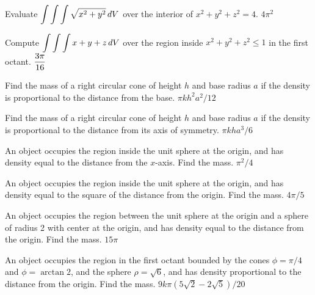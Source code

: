 \exercise Evaluate $\displaystyle\int\int\int \sqrt{x^2+y^2}\,dV$
over the interior of $x^2+y^2+z^2=4$.
\answer $4\pi^2$
\endanswer
\endexercise

\exercise Compute $\displaystyle\int\int\int
x+y+z\,dV$ over the region inside
$x^2+y^2+z^2\le 1$ in the first octant.
\answer $\displaystyle {3\pi\over16}$
\endanswer
\endexercise

\exercise Find the mass of a right circular cone of height $h$ and
base radius $a$ if the density is proportional to the distance from
the base.
\answer $\pi kh^2a^2/12$
\endanswer
\endexercise

\exercise Find the mass of a right circular cone of height $h$ and
base radius $a$ if the density is proportional to the distance from
its axis of symmetry.
\answer $\pi kha^3/6$
\endanswer
\endexercise

\exercise An object occupies the region inside the unit sphere at the
origin, and has density equal to the distance from the $x$-axis. Find
the mass.
\answer $\pi^2/4$
\endanswer
\endexercise

\exercise An object occupies the region inside the unit sphere at the
origin, and has density equal to the square of the distance from the
origin. Find the mass.
\answer $4\pi/5$
\endanswer
\endexercise

\exercise An object occupies the region between the unit sphere at the
origin and a sphere of radius 2 with center at the origin, and has
density equal to the distance from the origin. Find the mass.
\answer $15\pi$
\endanswer

\endexercise

\exercise An object occupies the region in the first octant bounded by
the cones $\phi = \pi/4$ and $\phi = \arctan 2$, and the sphere $\rho
= \sqrt{6}$, and has density proportional to the distance from the
origin. Find the mass.
\answer $9k\pi(5\sqrt2-2\sqrt5)/20$
\endanswer
\endexercise

\endexercises

